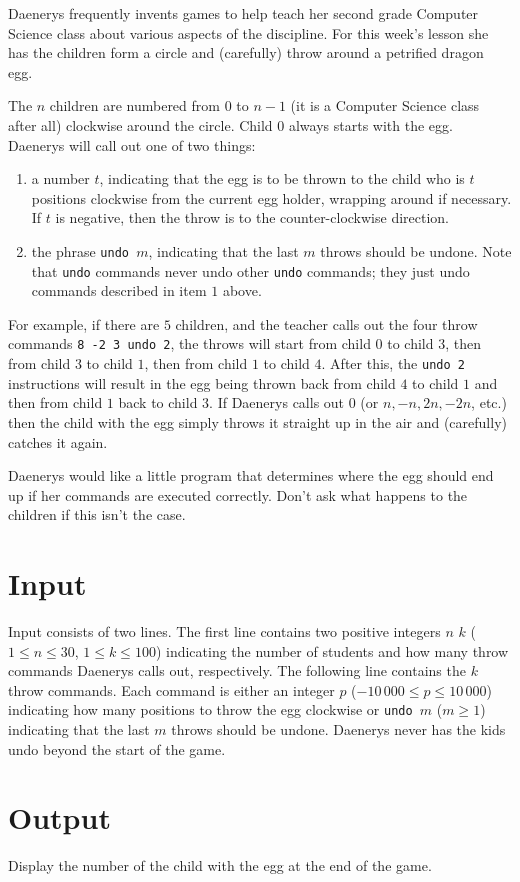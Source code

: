Daenerys frequently invents games to help teach her second grade Computer
Science class about various aspects of the discipline. For this week's lesson
she has the children form a circle and (carefully) throw around a petrified
dragon egg.

The $n$ children are numbered from $0$ to $n - 1$ (it is a Computer Science class
after all) clockwise around the circle. Child $0$ always starts with the egg.
Daenerys will call out one of two things:
\begin{enumerate}
\item a number $t$, indicating that the egg is to be thrown to the child who is
$t$ positions clockwise from the current egg holder, wrapping around if
necessary.  If $t$ is negative, then the throw is to the counter-clockwise
direction.
\item the phrase {\tt undo $m$}, indicating that the last $m$ throws should be
undone.  Note that {\tt undo} commands never undo other {\tt undo} commands;
they just undo commands described in item $1$ above.
\end{enumerate}
For example, if there are $5$ children, and the teacher calls out the four throw
commands {\tt 8 -2 3 undo 2}, the throws will start from child $0$ to child $3$,
then from child $3$ to child $1$, then from child $1$ to child $4$. After this, the
{\tt undo 2} instructions will result in the egg being thrown back from child $4$
to child $1$ and then from child $1$ back to child $3$. If Daenerys calls out $0$ (or
$n, -n, 2n, -2n$, etc.) then the child with the egg simply throws it straight up
in the air and (carefully) catches it again.

Daenerys would like a little program that determines where the egg should end up
if her commands are executed correctly.  Don't ask what happens to the children
if this isn't the case.

\section*{Input}
Input consists of two lines. The first line contains two positive integers $n$
$k$ ($1\leq n \leq 30$, $1 \leq k \leq 100$) indicating the number of students
and how many throw commands Daenerys calls out, respectively. The following line
contains the $k$ throw commands. Each command is either an integer $p$
($-10\,000 \leq p \leq 10\,000$) indicating how many positions to throw the egg
clockwise or {\tt undo }$m$ ($m \geq 1$) indicating that the last $m$ throws
should be undone.  Daenerys never has the kids undo beyond the start of the
game.

\section*{Output}
Display the number of the child with the egg at the end of the game.
